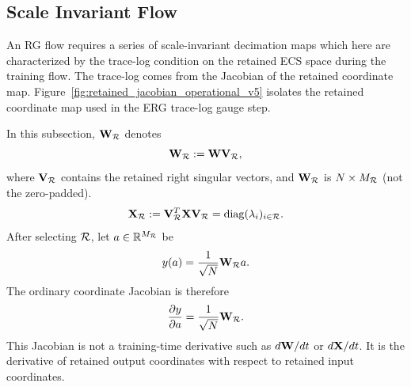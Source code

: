 \subsection{Scale Invariant Flow}
An RG flow requires a series of scale-invariant decimation maps which here are characterized by the trace-log condition on the retained ECS space
during the training flow.
The trace-log comes from the Jacobian of the retained coordinate map.  Figure~\ref{fig:retained_jacobian_operational_v5} isolates the retained coordinate map used in the ERG trace-log gauge step.

In this subsection, $\mathbf W_{\mathcal R}$ denotes
\begin{equation}
    \mathbf W_{\mathcal R}:=\mathbf W\mathbf V_{\mathcal R},
    \label{eq:retained_coordinate_weight_map_operational_v5}
\end{equation}
where $\mathbf V_{\mathcal R}$ contains the retained right singular vectors, and $\mathbf W_{\mathcal R}$ is $N\times M_{\mathcal R}$ (not the zero-padded).
\begin{equation}
    \mathbf X_{\mathcal R}
    :=
    \mathbf V_{\mathcal R}^{T}\mathbf X\mathbf V_{\mathcal R}
    =
    \operatorname{diag}(\lambda_i)_{i\in\mathcal R} .
    \label{eq:retained_correlation_operator_operational_v5}
\end{equation}
After selecting $\mathcal R$, let  $a\in\mathbb R^{M_{\mathcal R}}$ be
\begin{equation}
    y(a)=\frac{1}{\sqrt N}\mathbf W_{\mathcal R}a .
    \label{eq:retained_coord_map_operational_v5}
\end{equation}
The ordinary coordinate Jacobian is therefore
\begin{equation}
    \frac{\partial y}{\partial a}
    =
    \frac{1}{\sqrt N}\mathbf W_{\mathcal R} .
    \label{eq:retained_coord_jacobian_operational_v5}
\end{equation}
This Jacobian is not a training-time derivative such as $d\mathbf W/dt$ or $d\mathbf X/dt$.  It is the derivative of retained output coordinates with respect to retained input coordinates.

\begin{center}
\label{fig:retained_jacobian_operational_v5}
\end{center}


